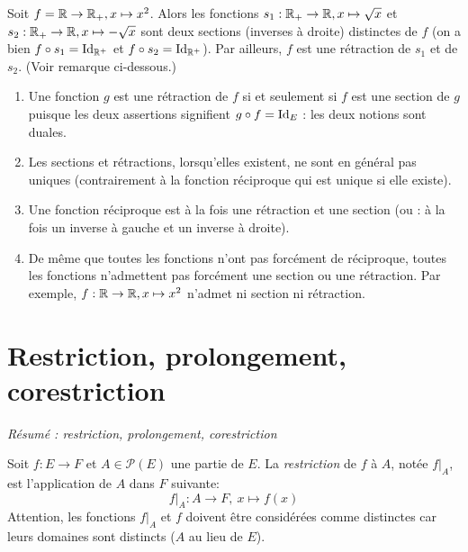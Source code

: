 \begin{exemple}
Soit $f = \mathbb{R}\to \mathbb{R}_+, x\mapsto x^2$. Alors les fonctions $s_1 : \mathbb{R}_+\to \mathbb{R}, x\mapsto \sqrt x$ et $s_2 : \mathbb{R}_+\to \mathbb{R}, x\mapsto -\sqrt x$ sont deux sections (inverses à droite) distinctes de $f$ (on a bien $f\circ s_1 = \operatorname{Id}_{\mathbb{R}^+}$ et $f\circ s_2 = \operatorname{Id}_{\mathbb{R}^+}$). 
Par ailleurs, $f$ est une rétraction de $s_1$ et de $s_2$. (Voir remarque ci-dessous.)
\end{exemple}

\begin{remarque}
\begin{enumerate}
\item Une fonction $g$ est une rétraction de $f$ si et seulement si $f$ est une section de $g$ puisque les deux assertions signifient $g\circ f = \operatorname{Id}_E$ : les deux notions sont \og duales\fg.
\item Les sections et rétractions, lorsqu'elles existent, ne sont en général pas uniques (contrairement à la fonction réciproque qui est unique si elle existe).
\item Une fonction réciproque est à la fois une rétraction et une section (ou : à la fois un inverse à gauche et un inverse à droite).
\item De même que toutes les fonctions n'ont pas forcément de réciproque, toutes les fonctions n'admettent pas forcément une section ou une rétraction. Par exemple, $f : \mathbb{R}\to \mathbb{R}, x\mapsto x^2$ n'admet ni section ni rétraction. 
\end{enumerate}
\end{remarque}




\section{Restriction, prolongement, corestriction}

\emph{Résumé : restriction, prolongement, corestriction}

\begin{definition}[Restriction]
Soit $f : E\to F$ et $A \in \mathcal P(E)$ une partie de $E$. La \emph{restriction} de $f$ à $A$, notée $f|_{A}$, est l'application de $A$ dans $F$ suivante:
\[
f|_{A} : A\to F, \: x\mapsto f(x)
\]
Attention, les fonctions $f|_A$ et $f$ doivent être considérées comme distinctes car leurs domaines sont distincts ($A$ au lieu de $E$).
\end{definition}

